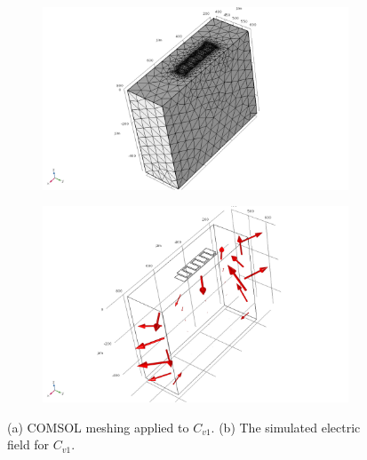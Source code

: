 \begin{figure}[b]
\centering
\begin{subfigure}[b]{0.45\textwidth}
   \includegraphics[width=1\linewidth]{varactormeshing}
	\caption{\label{fig:varactormeshing}}
\end{subfigure}
\begin{subfigure}[b]{0.45\textwidth}
   \includegraphics[width=1\linewidth]{electricfieldvectors}
	\caption{\label{fig:electricfieldvectors}}
\end{subfigure}
\caption[]{(a) COMSOL meshing applied to $C_{v1}$. (b) The simulated electric field for $C_{v1}$.}
\end{figure}









